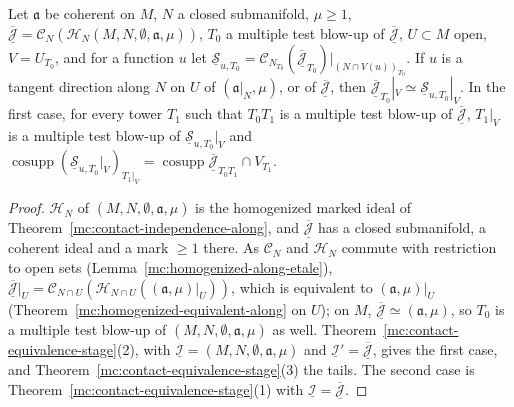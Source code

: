 \begin{corollary}
\label{mc:contact-equivalence-stage-coeff-hom}
\leanok
Let \(\mathfrak a\) be coherent on \(M\), \(N\) a closed submanifold, \(\mu\ge1\), \(\overline{\underline{\mathcal J}}=\mathcal C_N(\mathcal H_N(M,N,\emptyset,\mathfrak a,\mu))\), \(T_0\) a
multiple test blow-up of \(\overline{\underline{\mathcal J}}\), \(U\subset M\) open, \(V=U_{T_0}\), and for a function \(u\) let
\(\underline{\mathcal S}_{u,T_0}=\mathcal C_{N_{T_0}}(\overline{\underline{\mathcal J}}_{T_0})|_{(N\cap V(u))_{T_0}}\). If \(u\) is a tangent direction along \(N\) on \(U\) of
\((\mathfrak a|_N,\mu)\), or of \(\overline{\underline{\mathcal J}}\), then \(\overline{\underline{\mathcal J}}_{T_0}|_V\simeq\underline{\mathcal S}_{u,T_0}|_V\). In the first case, for every
tower \(T_1\) such that \(T_0T_1\) is a multiple test blow-up of \(\overline{\underline{\mathcal J}}\), \(T_1|_V\) is a multiple test blow-up of \(\underline{\mathcal S}_{u,T_0}|_V\) and
\(\operatorname{cosupp}(\underline{\mathcal S}_{u,T_0}|_V)_{T_1|_V}=\operatorname{cosupp}\overline{\underline{\mathcal J}}_{T_0T_1}\cap V_{T_1}\).
\end{corollary}
\begin{proof}
\leanok
\(\mathcal H_N\) of \((M,N,\emptyset,\mathfrak a,\mu)\) is the homogenized marked ideal of Theorem~\ref{mc:contact-independence-along}, and \(\overline{\underline{\mathcal J}}\) has a closed
submanifold, a coherent ideal and a mark \(\ge1\) there. As \(\mathcal C_N\) and \(\mathcal H_N\) commute with restriction to open sets (Lemma~\ref{mc:homogenized-along-etale}),
\(\overline{\underline{\mathcal J}}|_U=\mathcal C_{N\cap U}(\mathcal H_{N\cap U}((\mathfrak a,\mu)|_U))\), which is equivalent to \((\mathfrak a,\mu)|_U\) (Theorem~\ref{mc:homogenized-equivalent-along}
on \(U\)); on \(M\), \(\overline{\underline{\mathcal J}}\simeq(\mathfrak a,\mu)\), so \(T_0\) is a multiple test blow-up of \((M,N,\emptyset,\mathfrak a,\mu)\) as well.
Theorem~\ref{mc:contact-equivalence-stage}(2), with \(\underline{\mathcal I}=(M,N,\emptyset,\mathfrak a,\mu)\) and \(\underline{\mathcal I}'=\overline{\underline{\mathcal J}}\), gives the first case,
and Theorem~\ref{mc:contact-equivalence-stage}(3) the tails. The second case is Theorem~\ref{mc:contact-equivalence-stage}(1) with \(\underline{\mathcal I}=\overline{\underline{\mathcal J}}\).
\end{proof}
